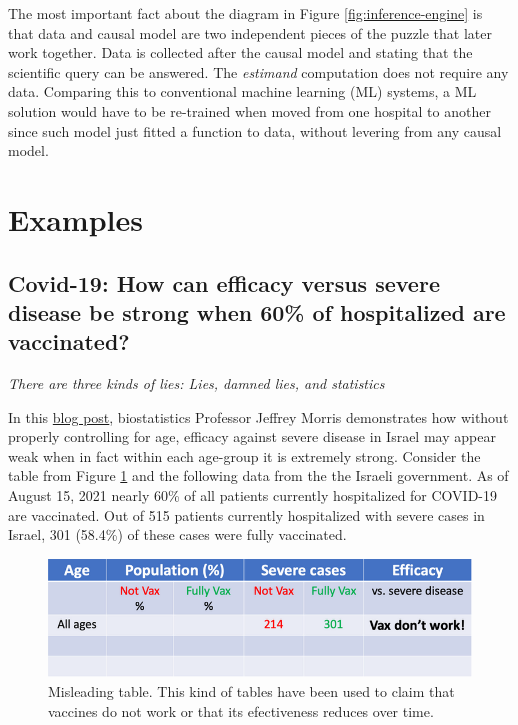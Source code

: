 \documentclass[
]{book}
\newenvironment{rnote}{\par\raggedleft}{\par}
\begin{document}
The most important fact about the diagram in Figure \ref{fig:inference-engine} is that data and causal model are two independent pieces of the puzzle that later work together. Data is collected after the causal model and stating that the scientific query can be answered. The \emph{estimand} computation does not require any data. Comparing this to conventional machine learning (ML) systems, a ML solution would have to be re-trained when moved from one hospital to another since such model just fitted a function to data, without levering from any causal model.

\hypertarget{examples-3}{%
\section{Examples}\label{examples-3}}

\hypertarget{covid-israel}{%
\subsection{Covid-19: How can efficacy versus severe disease be strong when 60\% of hospitalized are vaccinated?}\label{covid-israel}}

\begin{rnote}
\emph{There are three kinds of lies: Lies, damned lies, and statistics}

\end{rnote}

In this \href{https://www.covid-datascience.com/post/israeli-data-how-can-efficacy-vs-severe-disease-be-strong-when-60-of-hospitalized-are-vaccinated}{blog post}, biostatistics Professor Jeffrey Morris demonstrates how without properly controlling for age, efficacy against severe disease in Israel may appear weak when in fact within each age-group it is extremely strong. Consider the table from Figure \ref{fig:vaccine-rates-a} and the following data from the the Israeli government. As of August 15, 2021 nearly 60\% of all patients currently hospitalized for COVID-19 are vaccinated. Out of 515 patients currently hospitalized with severe cases in Israel, 301 (58.4\%) of these cases were fully vaccinated.

\begin{figure}

{\centering \includegraphics[width=0.7\linewidth]{Figures/vaccines-ex-fig1} 

}

\caption{Misleading table. This kind of tables have been used to claim that vaccines do not work or that its efectiveness reduces over time.}\label{fig:vaccine-rates-a}
\end{figure}
\end{document}
